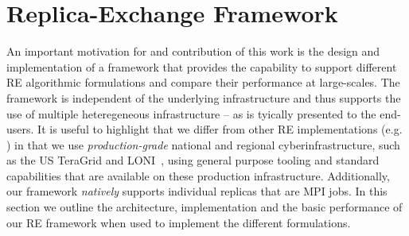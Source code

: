 \documentclass{rspublic}
\newcommand{\jhanote}[1]{ {\textcolor{red} { ***shantenu: #1 }}}
\newcommand{\alnote}[1]{ {\textcolor{blue} { ***andre: #1 }}}
\newcommand{\athotanote}[1]{ {\textcolor{green} { ***athota: #1 }}}
\newcommand{\alnote}[1]{}
\newcommand{\athotanote}[1]{}
\newcommand{\jhanote}[1]{}
\begin{document}



\section{Replica-Exchange Framework}\label{repexfw}

An important motivation for and contribution of this work is the design
and implementation of a framework that provides the capability to
support different RE algorithmic formulations and compare their
performance at large-scales.
The framework is independent of the underlying infrastructure and thus
supports the use of multiple heteregeneous infrastructure -- as is
tyically presented to the end-users.  It is useful to highlight that
we differ from other RE implementations (e.g.  \cite{parashar_arepex})
in that we use {\it production-grade} national and regional
cyberinfrastructure, such as the US TeraGrid and
LONI~\citep{LONI_web}, using general purpose tooling and standard
capabilities that are available on these production infrastructure.
Additionally, our framework {\it natively} supports individual
replicas that are MPI jobs. In this section we outline the
architecture, implementation and the basic performance of our RE
framework when used to implement the different formulations.
\end{document}
